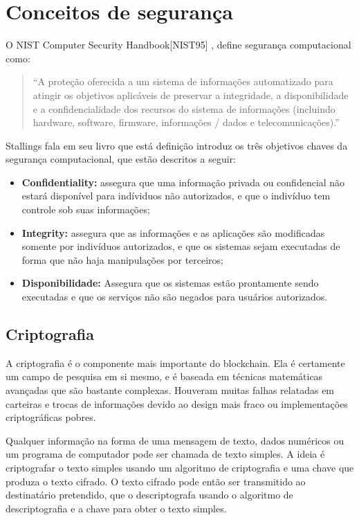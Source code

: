 
\section{Conceitos de segurança}

    O NIST Computer Security Handbook[NIST95] \cite{nist95}, define segurança computacional como:
    
     \begin{quote}
        ``A proteção oferecida a um sistema de informações automatizado para atingir os objetivos aplicáveis de preservar a integridade, a disponibilidade e a confidencialidade dos recursos do sistema de informações (incluindo hardware, software, firmware, informações / dados e telecomunicações).''
     \end{quote}
     
     Stallings fala em seu livro \cite{cryptograpy_and_network_stallings} que está definição introduz os três objetivos chaves da segurança computacional, que estão descritos a seguir:
        
        \begin{itemize}
            \item \textbf{Confidentiality:} assegura que uma informação privada ou confidencial não estará disponível para indíviduos não autorizados, e que o indivíduo tem controle sob suas informações;
            \item \textbf{Integrity:} assegura que as informações e as aplicações são modificadas somente por indivíduos autorizados, e que os sistemas sejam executadas de forma que não haja manipulações por terceiros;
            \item \textbf{Disponibilidade:} Assegura que os sistemas estão prontamente sendo executadas e que os serviços não são negados para usuários autorizados.
        \end{itemize}

    \subsection{Criptografia}
    
    A criptografia é o componente mais importante do blockchain. Ela é certamente um campo de pesquisa em si mesmo, e é baseada em técnicas matemáticas avançadas que são bastante complexas. Houveram muitas falhas relatadas em carteiras e trocas de informações devido ao design mais fraco ou implementações criptográficas pobres.\cite{beginnig_blockchain_bikramaditya}
    
    Qualquer informação na forma de uma mensagem de texto, dados numéricos ou um programa de computador pode ser chamada de texto simples. A ideia é criptografar o texto simples usando um algoritmo de criptografia e uma chave que produza o texto cifrado. O texto cifrado pode então ser transmitido ao destinatário pretendido, que o descriptografa usando o algoritmo de descriptografia e a chave para obter o texto simples.\cite{beginnig_blockchain_bikramaditya}
    
